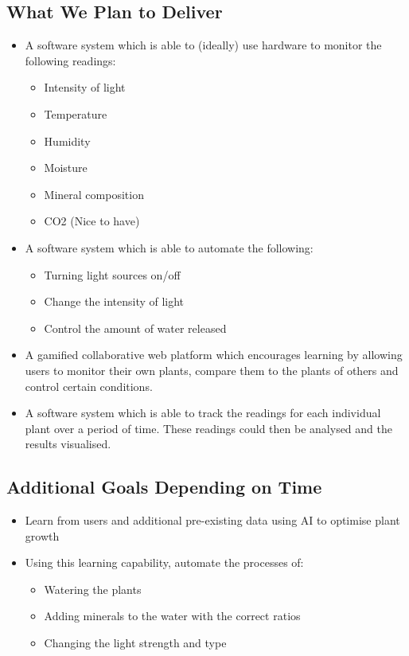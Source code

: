 \documentclass{article}
\begin{document}
	\subsection{What We Plan to Deliver}
		\begin{itemize}
			\item A software system which is able to (ideally) use hardware to monitor the following readings:
				\begin{itemize}
					\item Intensity of light
					\item Temperature
					\item Humidity
					\item Moisture
					\item Mineral composition
					\item CO2 (Nice to have)
				\end{itemize}
			\item A software system which is able to automate the following:
				\begin{itemize}
					\item Turning light sources on/off
					\item Change the intensity of light
					\item Control the amount of water released
				\end{itemize}
			\item A gamified collaborative web platform which encourages learning by allowing users to monitor their own plants, compare them to the plants of others and control certain conditions.
			\item A software system which is able to track the readings for each individual plant over a period of time. These readings could then be analysed and the results visualised.
		\end{itemize}
	\subsection{Additional Goals Depending on Time}
		\begin{itemize}
			\item Learn from users and additional pre-existing data using AI to optimise plant growth
			\item Using this learning capability, automate the processes of:
				\begin{itemize}
					\item Watering the plants
					\item Adding minerals to the water with the correct ratios
					\item Changing the light strength and type
				\end{itemize}
		\end{itemize}
\end{document}
